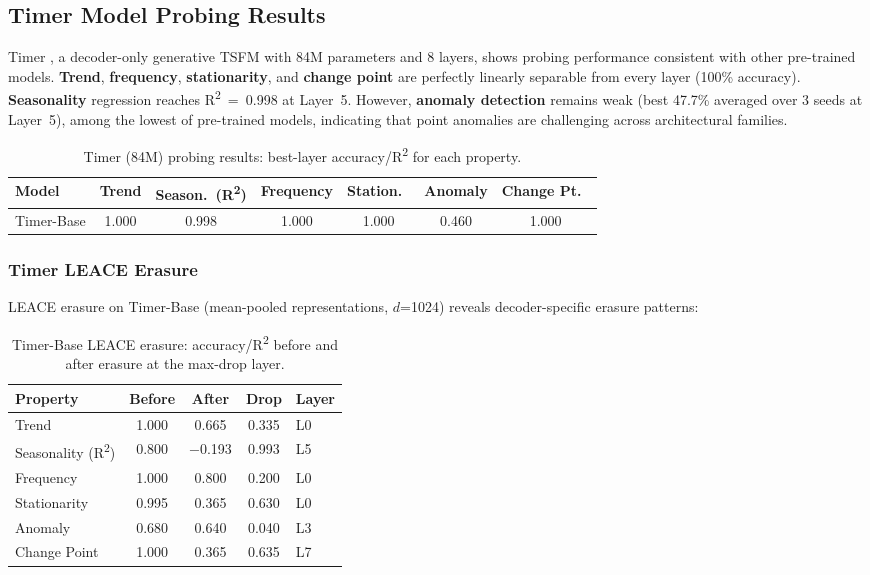 \documentclass{article}
\begin{document}
\subsection{Timer Model Probing Results}

Timer \cite{Liu2024b}, a decoder-only generative TSFM with 84M parameters and 8 layers, shows
probing performance consistent with other pre-trained models. \textbf{Trend}, \textbf{frequency},
\textbf{stationarity}, and \textbf{change point} are perfectly linearly separable from every
layer (100\% accuracy). \textbf{Seasonality} regression reaches R\textsuperscript{2}~=~0.998 at
Layer~5. However, \textbf{anomaly detection} remains weak (best 47.7\% averaged over 3 seeds at Layer~5), among the lowest of pre-trained models, indicating that point anomalies are challenging across architectural families.

\begin{table}[tbp]
\caption{Timer (84M) probing results: best-layer accuracy/R\textsuperscript{2} for each property.}
\label{tab:timer_probing}
\centering
\begin{tabular}{lcccccc}
\toprule
Model & Trend & Season.\ (R\textsuperscript{2}) & Frequency & Station.\ & Anomaly & Change Pt.\ \\
\midrule
Timer-Base & 1.000 & 0.998 & 1.000 & 1.000 & 0.460 & 1.000 \\
\bottomrule
\end{tabular}
\end{table}

\subsubsection{Timer LEACE Erasure}

LEACE erasure on Timer-Base (mean-pooled representations, $d$=1024) reveals decoder-specific erasure patterns:

\begin{table}[tbp]
\caption{Timer-Base LEACE erasure: accuracy/R\textsuperscript{2} before and after erasure at the
max-drop layer.}
\label{tab:timer_leace}
\centering
\small
\begin{tabular}{lcccl}
\toprule
Property & Before & After & Drop & Layer \\
\midrule
Trend & 1.000 & 0.665 & 0.335 & L0 \\
Seasonality (R\textsuperscript{2}) & 0.800 & $-$0.193 & 0.993 & L5 \\
Frequency & 1.000 & 0.800 & 0.200 & L0 \\
Stationarity & 0.995 & 0.365 & 0.630 & L0 \\
Anomaly & 0.680 & 0.640 & 0.040 & L3 \\
Change Point & 1.000 & 0.365 & 0.635 & L7 \\
\bottomrule
\end{tabular}
\end{table}
\end{document}
